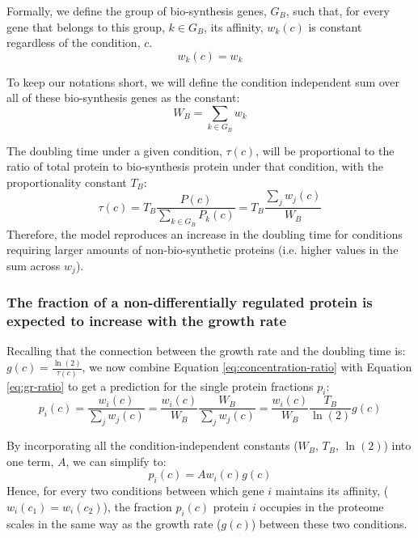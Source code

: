 \documentclass{article}
\begin{document}
Formally, we define the group of bio-synthesis genes, $G_B$, such that, for every gene that belongs to this group, $k \in G_B$, its affinity, $w_k(c)$ is constant regardless of the condition, $c$.
\begin{equation}
  \label{eq:biosynth-def}
  w_k(c)=w_k
\end{equation}

To keep our notations short, we will define the condition independent sum over all of these bio-synthesis genes as the constant:
\[
W_B = \sum_{k\in G_B}w_k
\]

The doubling time under a given condition, $\tau(c)$, will be proportional to the ratio of total protein to bio-synthesis protein under that condition, with the proportionality constant $T_B$:
\begin{equation}
  \label{eq:gr-ratio}
  \tau(c) = T_B\frac{P(c)}{\sum_{k\in G_B}P_k(c)}=T_B\frac{\sum_jw_j(c)}{W_B}
\end{equation}
Therefore, the model reproduces an increase in the doubling time for conditions requiring larger amounts of non-bio-synthetic proteins (i.e. higher values in the sum across $w_j$).

\subsubsection{The fraction of a non-differentially regulated protein is expected to increase with the growth rate}
Recalling that the connection between the growth rate and the doubling time is: $g(c)=\frac{\ln(2)}{\tau(c)}$, we now combine Equation \ref{eq:concentration-ratio} with Equation \ref{eq:gr-ratio} to get a prediction for the single protein fractions $p_i$:
\begin{equation}
  \label{eq:default-response}
  p_i(c)=\frac{w_i(c)}{\sum_jw_j(c)}=\frac{w_i(c)}{W_B}\frac{W_B}{\sum_jw_j(c)}=\frac{w_i(c)}{W_B}\frac{T_B}{\ln(2)}g(c)
\end{equation}

By incorporating all the condition-independent constants ($W_B$, $T_B$, $\ln(2)$) into one term, $A$, we can simplify to:
\begin{equation}
  \label{eq:final-conc}
  p_i(c)=Aw_i(c)g(c)
\end{equation}
Hence, for every two conditions between which gene $i$ maintains its affinity, ($w_i(c_1)=w_i(c_2)$), the fraction $p_i(c)$ protein $i$ occupies in the proteome scales in the same way as the growth rate ($g(c)$) between these two conditions.
\end{document}
